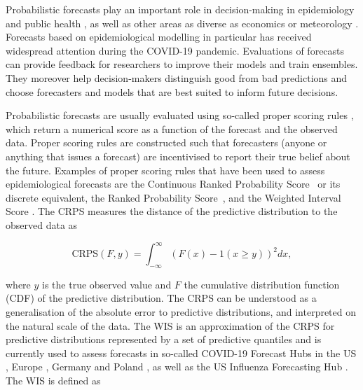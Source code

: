 \documentclass{article}
\begin{document}
Probabilistic forecasts \citep{heldProbabilisticForecastingInfectious2017} play an important role in decision-making in epidemiology and public health \citep{doi:10.2105/AJPH.2022.306831}, as well as other areas as diverse as economics \citep{timmermannForecastingMethodsFinance2018} or meteorology \citep{gneitingWeatherForecastingEnsemble2005}. Forecasts based on epidemiological modelling in particular has received widespread attention during the COVID-19 pandemic. Evaluations of forecasts can provide feedback for researchers to improve their models and train ensembles. They moreover help decision-makers distinguish good from bad predictions and choose forecasters and models that are best suited to inform future decisions.

Probabilistic forecasts are usually evaluated using so-called proper scoring rules \citep{gneitingStrictlyProperScoring2007}, which return a numerical score as a function of the forecast and the observed data. Proper scoring rules are constructed such that forecasters (anyone or anything that issues a forecast) are incentivised to report their true belief about the future. Examples of proper scoring rules that have been used to assess epidemiological forecasts are the Continuous Ranked Probability Score~\citep[CRPS,][]{gneitingStrictlyProperScoring2007} or its discrete equivalent, the Ranked Probability Score~\citep[RPS,][]{funkAssessingPerformanceRealtime2019}, and the Weighted Interval Score \citep{bracherEvaluatingEpidemicForecasts2021}. 
The CRPS measures the distance of the predictive distribution to the observed data as 
\begin{linenomath*}
\begin{equation*}
    \text{CRPS}(F, y) = \int_{-\infty}^\infty \left( F(x) - 1(x \geq y) \right)^2 dx,
\end{equation*}    
\end{linenomath*}
where $y$ is the true observed value and $F$ the cumulative distribution function (CDF) of the predictive distribution. The CRPS can be understood as a generalisation of the absolute error to predictive distributions, and interpreted on the natural scale of the data. The WIS is an approximation of the CRPS for predictive distributions represented by a set of predictive quantiles and is currently used to assess forecasts in so-called COVID-19 Forecast Hubs in the US \citep{cramerCOVID19ForecastHub2020, cramerEvaluationIndividualEnsemble2021}, Europe \citep{sherrattPredictivePerformanceMultimodel2022}, Germany and Poland \citep{bracherShorttermForecastingCOVID192021, bracherNationalSubnationalShortterm2021}, as well as the US Influenza Forecasting Hub \citep{CdcepiFlusightforecastdata2022}. The WIS is defined as 
\end{document}
